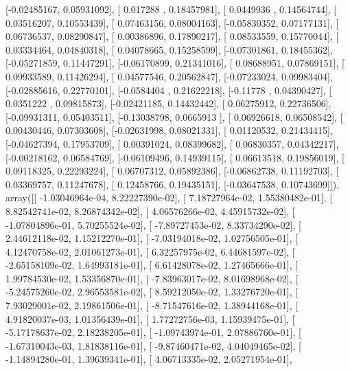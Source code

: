 \documentclass{article}
\begin{document}
       [-0.02485167,  0.05931092],
       [ 0.017288  ,  0.18457981],
       [ 0.0449936 ,  0.14564744],
       [ 0.03516207,  0.10553439],
       [ 0.07463156,  0.08004163],
       [-0.05830352,  0.07177131],
       [ 0.06736537,  0.08290847],
       [ 0.00386896,  0.17890217],
       [ 0.08533559,  0.15770044],
       [ 0.03334464,  0.04840318],
       [ 0.04078665,  0.15258599],
       [-0.07301861,  0.18455362],
       [-0.05271859,  0.11447291],
       [-0.06170899,  0.21341016],
       [ 0.08688951,  0.07869151],
       [ 0.09933589,  0.11426294],
       [ 0.04577546,  0.20562847],
       [-0.07233024,  0.09983404],
       [-0.02885616,  0.22770101],
       [-0.0584404 ,  0.21622218],
       [-0.11778   ,  0.04390427],
       [ 0.0351222 ,  0.09815873],
       [-0.02421185,  0.14432442],
       [ 0.06275912,  0.22736506],
       [-0.09931311,  0.05403511],
       [-0.13038798,  0.0665913 ],
       [ 0.06926618,  0.06508542],
       [ 0.00430446,  0.07303608],
       [-0.02631998,  0.08021331],
       [ 0.01120532,  0.21434415],
       [-0.04627394,  0.17953709],
       [ 0.00391024,  0.08399682],
       [ 0.06830357,  0.04342217],
       [-0.00218162,  0.06584769],
       [-0.06109496,  0.14939115],
       [ 0.06613518,  0.19856019],
       [ 0.09118325,  0.22293224],
       [ 0.06707312,  0.05892386],
       [-0.06862738,  0.11192703],
       [ 0.03369757,  0.11247678],
       [ 0.12458766,  0.19435151],
       [-0.03647538,  0.10743699]]), array([[ -1.03046964e-04,   8.22227390e-02],
       [  7.18727964e-02,   1.55380482e-01],
       [  8.82542741e-02,   8.26874342e-02],
       [  4.06576266e-02,   4.45915732e-02],
       [ -1.07804896e-01,   5.70255524e-02],
       [ -7.89727453e-02,   8.33734290e-02],
       [  2.44612118e-02,   1.15212270e-01],
       [ -7.03194018e-02,   1.02756505e-01],
       [  4.12470758e-02,   2.01061273e-01],
       [  6.32257975e-02,   6.44681597e-02],
       [ -2.65158109e-02,   1.64993181e-01],
       [  6.61428078e-02,   1.27465666e-01],
       [  1.99784530e-02,   1.53356870e-01],
       [ -7.83963017e-02,   8.01698968e-02],
       [ -5.24575260e-02,   2.96553581e-02],
       [  8.59212050e-02,   1.33276720e-01],
       [  7.93029001e-02,   2.19861506e-01],
       [ -8.71547616e-02,   1.38944168e-01],
       [  4.91820037e-03,   1.01356439e-01],
       [  1.77272756e-03,   1.15939475e-01],
       [ -5.17178637e-02,   2.18238205e-01],
       [ -1.09743974e-01,   2.07886760e-01],
       [ -1.67310043e-03,   1.81838116e-01],
       [ -9.87460471e-02,   4.04049465e-02],
       [ -1.14894280e-01,   1.39639341e-01],
       [  4.06713335e-02,   2.05271954e-01],
\end{document}
